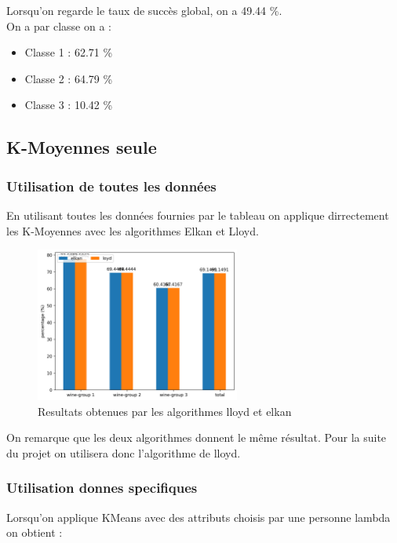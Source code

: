 \documentclass[a4paper,12pt]{article}
\begin{document}
Lorsqu'on regarde le taux de succès global, on a 49.44 \%.\\

On a par classe on a :
\begin{itemize}
\item Classe 1 : 62.71 \%
\item Classe 2 : 64.79 \%
\item Classe 3 : 10.42 \%
\end{itemize}

\subsection{K-Moyennes seule}
\subsubsection{Utilisation de toutes les données}
En utilisant toutes les données fournies par le tableau on applique dirrectement les K-Moyennes avec les algorithmes Elkan et Lloyd.

\begin{figure}[h!] %
   \centering
   \includegraphics[width=0.6\textwidth]{comparaison_algos.png} %
   \caption{Resultats obtenues par les algorithmes lloyd et elkan}
   \label{comparaison_algos.png} %
\end{figure}

On remarque que les deux algorithmes donnent le même résultat. Pour la suite du projet on utilisera donc l'algorithme de lloyd.

\subsubsection{Utilisation donnes specifiques}

Lorsqu'on applique KMeans avec des attributs choisis par une personne lambda on obtient :
\end{document}
